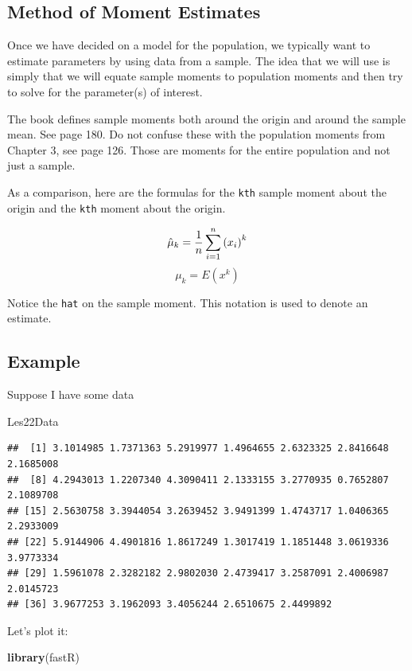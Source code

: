 \documentclass[]{book}
\newenvironment{Shaded}{\begin{snugshade}}{\end{snugshade}}
\newcommand{\KeywordTok}[1]{\textcolor[rgb]{0.13,0.29,0.53}{\textbf{#1}}}
\newcommand{\NormalTok}[1]{#1}
\theoremstyle{definition}
\theoremstyle{definition}
\theoremstyle{definition}
\theoremstyle{remark}
\begin{document}
\subsection{Method of Moment
Estimates}\label{method-of-moment-estimates}

Once we have decided on a model for the population, we typically want to
estimate parameters by using data from a sample. The idea that we will
use is simply that we will equate sample moments to population moments
and then try to solve for the parameter(s) of interest.

The book defines sample moments both around the origin and around the
sample mean. See page 180. Do not confuse these with the population
moments from Chapter 3, see page 126. Those are moments for the entire
population and not just a sample.

As a comparison, here are the formulas for the \texttt{kth} sample
moment about the origin and the \texttt{kth} moment about the origin.

\[\hat{\mu}_{k}={1 \over n}\sum_{i=1}^n\left( x_{i} \right)^k\]
\[\mu_{k}=E\left(x^k \right)\]

Notice the \texttt{hat} on the sample moment. This notation is used to
denote an estimate.

\subsection{Example}\label{example-1}

Suppose I have some data

\begin{Shaded}
\begin{Highlighting}[]
\NormalTok{Les22Data}
\end{Highlighting}
\end{Shaded}

\begin{verbatim}
##  [1] 3.1014985 1.7371363 5.2919977 1.4964655 2.6323325 2.8416648 2.1685008
##  [8] 4.2943013 1.2207340 4.3090411 2.1333155 3.2770935 0.7652807 2.1089708
## [15] 2.5630758 3.3944054 3.2639452 3.9491399 1.4743717 1.0406365 2.2933009
## [22] 5.9144906 4.4901816 1.8617249 1.3017419 1.1851448 3.0619336 3.9773334
## [29] 1.5961078 2.3282182 2.9802030 2.4739417 3.2587091 2.4006987 2.0145723
## [36] 3.9677253 3.1962093 3.4056244 2.6510675 2.4499892
\end{verbatim}

Let's plot it:

\begin{Shaded}
\begin{Highlighting}[]
\KeywordTok{library}\NormalTok{(fastR)}
\end{Highlighting}
\end{Shaded}
\end{document}
